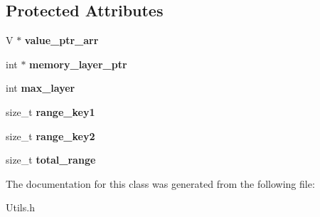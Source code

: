 \subsection*{Protected Attributes}
\begin{DoxyCompactItemize}
\item 
\mbox{\label{classEnum__fast__memory__dual__key__map_ae172c1e533acf94c152f0f46774f3eaa}} 
V $\ast$ {\bfseries value\+\_\+ptr\+\_\+arr}
\item 
\mbox{\label{classEnum__fast__memory__dual__key__map_a62ba80580e7d4040d0f38234054ad744}} 
int $\ast$ {\bfseries memory\+\_\+layer\+\_\+ptr}
\item 
\mbox{\label{classEnum__fast__memory__dual__key__map_afca4d38dc224d5d2bf24481acdde3143}} 
int {\bfseries max\+\_\+layer}
\item 
\mbox{\label{classEnum__fast__memory__dual__key__map_a82e32b5b4f473ed31fb5f0e01eb99a16}} 
size\+\_\+t {\bfseries range\+\_\+key1}
\item 
\mbox{\label{classEnum__fast__memory__dual__key__map_add6cbf8d7ce0d6e27f51c6fd90e93f2a}} 
size\+\_\+t {\bfseries range\+\_\+key2}
\item 
\mbox{\label{classEnum__fast__memory__dual__key__map_a8a729ebf59f119317e3e1fa4547d819e}} 
size\+\_\+t {\bfseries total\+\_\+range}
\end{DoxyCompactItemize}


The documentation for this class was generated from the following file\+:\begin{DoxyCompactItemize}
\item 
Utils.\+h\end{DoxyCompactItemize}
